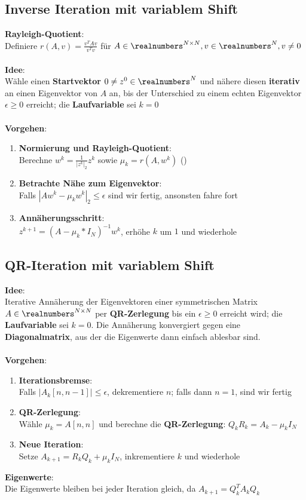 \subsection{Inverse Iteration mit variablem Shift}%
\label{ew:inverse-iteration}
\textbf{Rayleigh-Quotient}:\\Definiere $r(A, v) = \frac{v^TAv}{v^Tv}$ für $A \in \realnumbers^{N\times N}, v \in \realnumbers^N, v \neq 0$\\\\
\textbf{Idee}:\\Wähle einen \textbf{Startvektor} $0 \neq z^0 \in \realnumbers^N$ und nähere diesen \textbf{iterativ} an einen Eigenvektor von $A$ an, bis der Unterschied zu einem echten Eigenvektor $\epsilon \geq 0$ erreicht; die \textbf{Laufvariable} sei $k = 0$\\\\
\textbf{Vorgehen}:
\begin{enumerate}
	\item \textbf{Normierung und Rayleigh-Quotient}:\\Berechne $w^k = \frac{1}{|z^k|_2}z^k$ sowie $\mu_k = r(A, w^k)$ ()
	\item \textbf{Betrachte Nähe zum Eigenvektor}:\\Falls $|Aw^k - \mu_k w^k|_2 \leq \epsilon$ sind wir fertig, ansonsten fahre fort
	\item \textbf{Annäherungsschritt}:\\$z^{k+1} = (A - \mu_k * I_N)^{-1}w^k$, erhöhe $k$ um $1$ und wiederhole
\end{enumerate}

\newpage
\subsection{QR-Iteration mit variablem Shift}%
\label{ew:sub:qr-iteration}
\textbf{Idee}:\\Iterative Annäherung der Eigenvektoren einer symmetrischen Matrix $A \in \realnumbers^{N\times N}$ per \textbf{QR-Zerlegung} bis ein $\epsilon \geq 0$ erreicht wird; die \textbf{Laufvariable} sei $k = 0$. Die Annäherung konvergiert gegen eine\\\textbf{Diagonalmatrix}, aus der die Eigenwerte dann einfach ablesbar sind.\\\\
\textbf{Vorgehen}:
\begin{enumerate}
	\item \textbf{Iterationsbremse}:\\Falls $|A_k[n, n-1]| \leq \epsilon$, dekrementiere $n$; falls dann $n = 1$, sind wir fertig
	\item \textbf{QR-Zerlegung}:\\Wähle $\mu_k = A[n,n]$ und berechne die \textbf{QR-Zerlegung}: $Q_kR_k = A_k - \mu_kI_N$
	\item \textbf{Neue Iteration}:\\Setze $A_{k+1} = R_kQ_k + \mu_kI_N$, inkrementiere $k$ und wiederhole
\end{enumerate}
\textbf{Eigenwerte}:\\Die Eigenwerte bleiben bei jeder Iteration gleich, da $A_{k + 1} = Q_k^TA_kQ_k$

